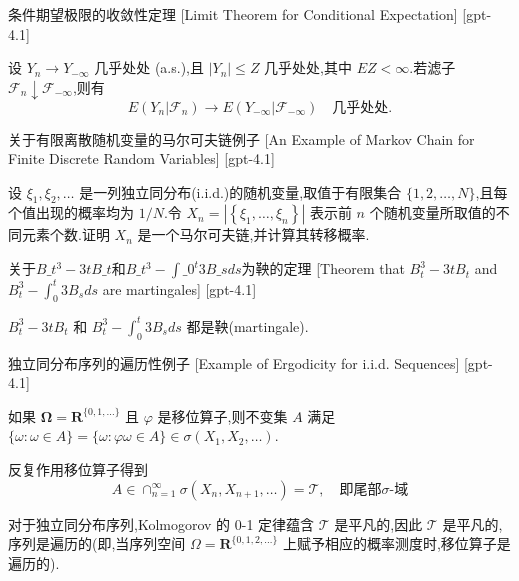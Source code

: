 \documentclass[UTF8]{ctexart}
\begin{document}
    
    
    \begin{thm}
        {条件期望极限的收敛性定理}
        [Limit Theorem for Conditional Expectation]
        [gpt-4.1]
        
设 $Y_{n} \to Y_{-\infty}$ 几乎处处 (a.s.),且 $|Y_{n}| \leq Z$ 几乎处处,其中 $E Z < \infty$.若滤子 $\mathcal{F}_{n} \downarrow \mathcal{F}_{-\infty}$,则有
\[
E(Y_{n} | \mathcal{F}_{n}) \to E(Y_{-\infty} | \mathcal{F}_{-\infty}) \quad \text{几乎处处}.
\]

    \end{thm}
    
    
    
    \begin{xmp}
        {关于有限离散随机变量的马尔可夫链例子}
        [An Example of Markov Chain for Finite Discrete Random Variables]
        [gpt-4.1]
        
设 $\xi_{1}, \xi_{2}, \ldots$ 是一列独立同分布(i.i.d.)的随机变量,取值于有限集合 $\{1, 2, \ldots, N\}$,且每个值出现的概率均为 $1/N$.令 $X_{n} = \left|\left\{\xi_{1}, \ldots, \xi_{n}\right\}\right|$ 表示前 $n$ 个随机变量所取值的不同元素个数.证明 $X_{n}$ 是一个马尔可夫链,并计算其转移概率.

    \end{xmp}
    
    
    
    \begin{thm}
        {关于$B\_t^3 - 3tB\_t$和$B\_t^3 - \int\_0^t 3 B\_s ds$为鞅的定理}
        [Theorem that $B_t^3 - 3tB_t$ and $B_t^3 - \int_0^t 3 B_s ds$ are martingales]
        [gpt-4.1]
        
$B_t^3 - 3tB_t$ 和 $B_t^3 - \int_0^t 3 B_s ds$ 都是鞅(martingale).

    \end{thm}
    
    
    
    \begin{xmp}
        {独立同分布序列的遍历性例子}
        [Example of Ergodicity for i.i.d. Sequences]
        [gpt-4.1]
        
如果 $\boldsymbol{\Omega} = \mathbf{R}^{\{0, 1, \ldots\}}$ 且 $\varphi$ 是移位算子,则不变集 $A$ 满足 $\{\omega : \omega \in A\} = \{\omega : \varphi \omega \in A\} \in \sigma(X_{1}, X_{2}, \ldots)$.

反复作用移位算子得到
\[
A \in \cap_{n=1}^{\infty} \sigma(X_{n}, X_{n+1}, \ldots) = \mathcal{T}, \quad \text{即尾部}\sigma\text{-域}
\]

对于独立同分布序列,Kolmogorov 的 0-1 定律蕴含 $\mathcal{T}$ 是平凡的,因此 $\mathcal{T}$ 是平凡的,序列是遍历的(即,当序列空间 $\Omega = \mathbf{R}^{\{0, 1, 2, \dots\}}$ 上赋予相应的概率测度时,移位算子是遍历的).

    \end{xmp}
    
\end{document}

